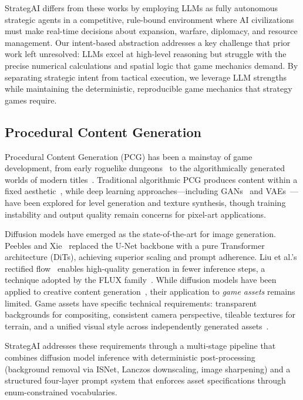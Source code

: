 \documentclass[conference]{IEEEtran}
\begin{document}
StrategAI differs from these works by employing LLMs as fully autonomous strategic agents in a competitive, rule-bound environment where AI civilizations must make real-time decisions about expansion, warfare, diplomacy, and resource management. Our intent-based abstraction addresses a key challenge that prior work left unresolved: LLMs excel at high-level reasoning but struggle with the precise numerical calculations and spatial logic that game mechanics demand. By separating strategic intent from tactical execution, we leverage LLM strengths while maintaining the deterministic, reproducible game mechanics that strategy games require.

\subsection{Procedural Content Generation}

Procedural Content Generation (PCG) has been a mainstay of game development, from early roguelike dungeons~\cite{toy1980rogue} to the algorithmically generated worlds of modern titles~\cite{hello2016no}. Traditional algorithmic PCG produces content within a fixed aesthetic~\cite{smith2011answering}, while deep learning approaches---including GANs~\cite{goodfellow2016generative, summerville2018machine} and VAEs~\cite{kingma2013auto}---have been explored for level generation and texture synthesis, though training instability and output quality remain concerns for pixel-art applications.

Diffusion models have emerged as the state-of-the-art for image generation. Peebles and Xie~\cite{peebles2023scalable} replaced the U-Net backbone with a pure Transformer architecture (DiTs), achieving superior scaling and prompt adherence. Liu et al.'s rectified flow~\cite{liu2023rectified} enables high-quality generation in fewer inference steps, a technique adopted by the FLUX family~\cite{esser2024scaling}. While diffusion models have been applied to creative content generation~\cite{rombach2022high, dreamfusion2022}, their application to \emph{game assets} remains limited. Game assets have specific technical requirements: transparent backgrounds for compositing, consistent camera perspective, tileable textures for terrain, and a unified visual style across independently generated assets~\cite{smith2011answering}.

StrategAI addresses these requirements through a multi-stage pipeline that combines diffusion model inference with deterministic post-processing (background removal via ISNet, Lanczos downscaling, image sharpening) and a structured four-layer prompt system that enforces asset specifications through enum-constrained vocabularies.
\end{document}
